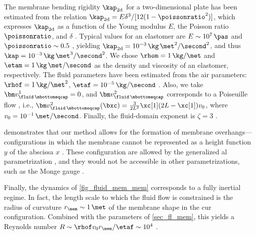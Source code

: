 The membrane bending rigidity $\kaptwod$ for a two-dimensional plate  has been estimated from the relation $\kaptwod = E \delta^3/[12(1-\poissonratio^2)]$, which expresses $\kaptwod$ as a function of the Young modulus $E$, the Poisson ratio $\poissonratio$, and  $\delta$ \cite{landauTheoryElasticity1986}.
Typical values for an elastomer   are $E \sim 10^7 \, \pas$ \cite{fengPreparationCharacterizationSilicone2017} and $\poissonratio \sim 0.5$ \cite{mullerQuickAccurateMethod2019}, yielding $\kaptwod = 10^{-3} \, \kg \, \met^2/\second^2$, and thus $\kap =  10^{-3} \, \kg \, \met^3/\second^2$.
We chose $\rhom = 1 \, \kg /  \met$ and $\etam = 1 \, \kg\, \met /\second $ as the density \cite{caiSoftPolydimethylsiloxaneElastomers2015} and viscosity \cite{pochivalovDevelopmentVibrationDamping2021} of an elastomer, respectively.
The fluid parameters have been estimated from the air parameters:  $\rhof = 1 \, \kg/\met^2$, $\etaf = 10^{-5} \, \kg / \second$ \cite{hilsenrath1955tables}.
Also, we take $\vfbottom^1 =0$, and $\vfbottom^2$ corresponds to a Poiseuille flow \cite{landauFluidMechanics1987}, i.e.,  $\vfbottom^2(\bxc) =  \frac{3}{2 L^2}  \xc[1] (2 L -\xc[1]) v_0$, where $v_0 = 10^{-1}  \, \met / \second$.  Finally, the fluid-domain exponent is $\zeta = 3$ \cite{kamenskyLectureNotesMAE}.

 demonstrates that our method allows for the formation of membrane overhangs---configurations in which the membrane cannot be represented as a height function $y$ of the abscissa $x$ \cite{worthmullerIRENEFluIdLayeR2025}. These configuration are allowed by the generalized \acl{al} parametrization , and they would not be accessible in other parametrizations, such as the Monge gauge \cite{hsiungFirstCourseDifferential1981}.

Finally, the dynamics of \cref{fig_fluid_mem_mem} corresponds to a fully inertial regime. In fact, the length scale to which the fluid flow is constrained is the radius of curvature $r_\mem \sim 1 \, \met$ of the membrane shape in the \ac{cur} configuration. Combined with the parameters of \cref{sec_fl_mem}, this yields a Reynolds number  $R \sim \rhof v_0 r_\mem / \etaf \sim 10^4$ \cite{landauFluidMechanics1987}.

